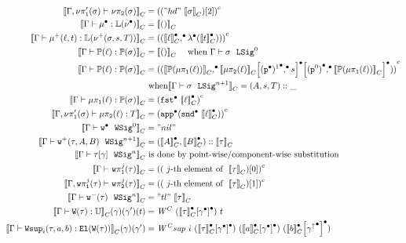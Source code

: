 \begin{align*}
  \denotesC{\goodType{\Gm, \lsigprojT{\lsig}}{\lsigproj{2}{\lsig}}{}} &= \Gmodel{("hd"~\denotesC{\lsig})[2]}\\
  \denotesC{\goodTerm{\Gm}{\LkgEmp}{\TyLkg{\LSigEmp}}} &= \denotesC{\unit} \\
  \denotesC{\goodTerm{\Gm}{\LkgAdd{\lkg}{t}}{\TyLkg{\LSigAdd{\lsig}{s}{T}}}} &= \Gmodel{\Gpair{\denotesCC{\lkg}}{\Glam{\denotesCC{t}}}} \\
  \denotesC{\goodTerm{\Gm}{\Tkg{\lkg}}{\TyTkg{\lsig}}} &= \denotesC{\unit}
  \quad \text{ when \goodSig{\Gm}{\lsig}{0}} \\
  \denotesC{\goodTerm{\Gm}{\Tkg{\lkg}}{\TyTkg{\lsig}}} &= \Gmodel{\Gpair{\denotesC{\Tkg{\lkgproj{1}{\lkg}}}}{\Gsub{\Gsub{\denotesC{\lkgproj{2}{\lkg}}}{\GSubstExt{\Glued{\GSubstWeak{1}}}{s}}}{\GSubstExt{\Glued{(\SubstId)}}{\denotesC{\Tkg{\lkgproj{1}{\lkg}}}}}}}
  \\ &\text{ when} \denotesC{\goodSig{\Gm}{\lsig}{n+1}} = (A, s, T)::\_ \\
  \denotesC{\goodTerm{\Gm}{\lkgproj{1}{\lkg}}{\TyTkg{\lsig}}} &= \Gmodel{\Gfst{\denotesCC{\lkg}}} \\
  \denotesC{\goodTerm{\Gm, \lsigprojT{\lsig}}{\lkgproj{2}{\lkg}}{T}} &= \Gmodel{\Gapp{\Gsnd{\denotesCC{\lkg}}}} \\
  \denotesC{\goodWSig{\Gm}{\WSigEmp}{0}} &= "nil" \\
  \denotesC{\goodWSig{\Gm}{\WSigAdd{\wsig}{A}{B}}{n+1}} &= (\denotesCC{A} , \denotesCC{B}) :: \denotesC{\wsig}\\
  \denotesC{\goodWSig{\Gm}{\sub{\wsig}{\gm}}{n}} & \text{ is done by point-wise/component-wise substitution} \\
  \denotesC{\goodType{\Gm}{\wsigproj{j}{1}{\wsig}}{}} &= \Gmodel{(\text{ $j$-th element of }~\denotesC{\wsig})[0]}\\
  \denotesC{\goodType{\Gm, \wsigproj{j}{1}{\wsig}}{\wsigproj{j}{2}{\wsig}}{}} &= \Gmodel{(\text{ $j$-th element of }~\denotesC{\wsig})[1]}\\
  \denotesC{\goodWSig{\Gm}{\WSigSub{\wsig}}{n}} &= "tl"~\denotesC{\wsig}\\
  \denotesC{\goodTerm{\Gm}{\wcode{\wsig}}{\cU}}(\gm)(\gm')(t) &= \CWmodel~(\Gsub{\denotesCC{\wsig}}{\Glued{\gm}})~t \\
  \denotesC{\goodTerm{\Gm}{\Wsup{i}{\wsig}{a}{b}}{\El{\wcode{\wsig}}}}(\gm)(\gm') &= \CWsup~i~(\Gsub{\denotesCC{\wsig}}{\Glued{\gm}})~(\Gsub{\denotesCC{a}}{\Glued{\gm}})~(\Gsub{\denotesCC{b}}{{\Glued{\gm^\uparrow}}}) \\

\end{align*}
